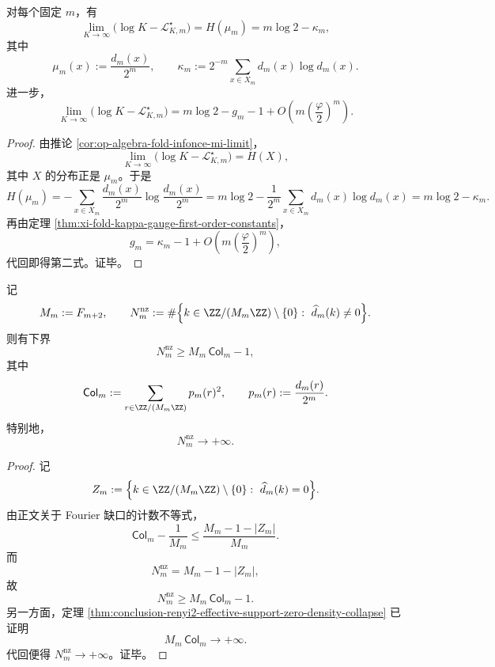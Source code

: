 \begin{corollary}[大负样本极限中的可见熵互补律]\label{cor:conclusion-infonce-large-k-visible-entropy-complement}
对每个固定 \(m\)，有
\[
\lim_{K\to\infty}\bigl(\log K-\mathcal L_{K,m}^\star\bigr)
=
H(\mu_m)
=
m\log 2-\kappa_m,
\]
其中
\[
\mu_m(x):=\frac{d_m(x)}{2^m},
\qquad
\kappa_m:=2^{-m}\sum_{x\in X_m}d_m(x)\log d_m(x).
\]
进一步，
\[
\lim_{K\to\infty}\bigl(\log K-\mathcal L_{K,m}^\star\bigr)
=
m\log 2-g_m-1+O\!\left(m\left(\frac{\varphi}{2}\right)^m\right).
\]
\end{corollary}

\begin{proof}
由推论 \ref{cor:op-algebra-fold-infonce-mi-limit}，
\[
\lim_{K\to\infty}\bigl(\log K-\mathcal L_{K,m}^\star\bigr)=H(X),
\]
其中 \(X\) 的分布正是 \(\mu_m\)。于是
\[
H(\mu_m)
=
-\sum_{x\in X_m}\frac{d_m(x)}{2^m}\log\frac{d_m(x)}{2^m}
=
m\log 2-\frac1{2^m}\sum_{x\in X_m}d_m(x)\log d_m(x)
=
m\log 2-\kappa_m.
\]
再由定理 \ref{thm:xi-fold-kappa-gauge-first-order-constants}，
\[
g_m=\kappa_m-1+O\!\left(m\left(\frac{\varphi}{2}\right)^m\right),
\]
代回即得第二式。证毕。
\end{proof}

\begin{corollary}\label{cor:conclusion-fourier-active-mode-count-diverges}
记
\[
M_m:=F_{m+2},
\qquad
N_m^{\mathrm{nz}}
:=
\#\Bigl\{
k\in \ZZ/(M_m\ZZ)\setminus\{0\}:\ \widehat d_m(k)\neq 0
\Bigr\}.
\]
则有下界
\[
N_m^{\mathrm{nz}}\ge M_m\,\mathsf{Col}_m-1,
\]
其中
\[
\mathsf{Col}_m:=\sum_{r\in \ZZ/(M_m\ZZ)}p_m(r)^2,
\qquad
p_m(r):=\frac{d_m(r)}{2^m}.
\]
特别地，
\[
N_m^{\mathrm{nz}}\longrightarrow +\infty.
\]
\end{corollary}

\begin{proof}
记
\[
Z_m:=\Bigl\{
k\in \ZZ/(M_m\ZZ)\setminus\{0\}:\ \widehat d_m(k)=0
\Bigr\}.
\]
由正文关于 Fourier 缺口的计数不等式，
\[
\mathsf{Col}_m-\frac1{M_m}
\le
\frac{M_m-1-|Z_m|}{M_m}.
\]
而
\[
N_m^{\mathrm{nz}}=M_m-1-|Z_m|,
\]
故
\[
N_m^{\mathrm{nz}}\ge M_m\,\mathsf{Col}_m-1.
\]
另一方面，定理 \ref{thm:conclusion-renyi2-effective-support-zero-density-collapse} 已证明
\[
M_m\,\mathsf{Col}_m\to+\infty.
\]
代回便得 \(N_m^{\mathrm{nz}}\to+\infty\)。证毕。
\end{proof}



